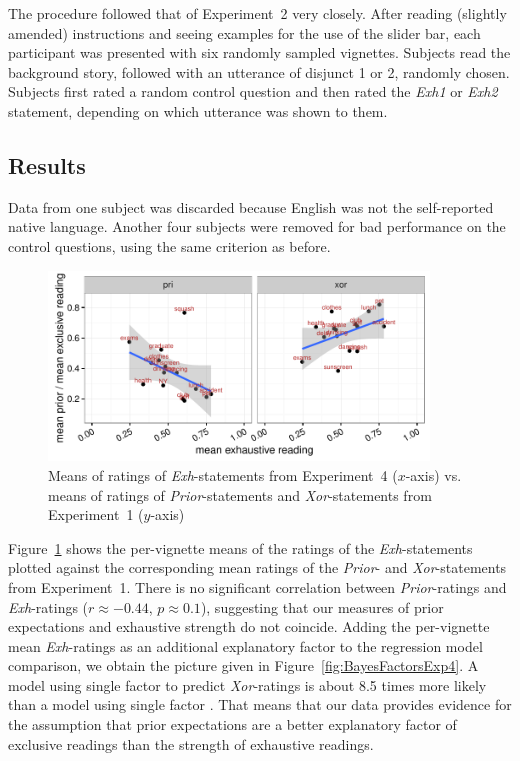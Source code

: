 \documentclass[12pt]{article}
\begin{document}
The procedure followed that of Experiment~2 very closely. After reading (slightly amended)
instructions and seeing examples for the use of the slider bar, each participant was presented
with six randomly sampled vignettes. Subjects read the background story, followed with an
utterance of disjunct 1 or 2, randomly chosen. Subjects first rated a random control question
and then rated the \emph{Exh1} or \emph{Exh2} statement, depending on which utterance was shown
to them.

\subsection{Results}

Data from one subject was discarded because English was not the self-reported native
language. Another four subjects were removed for bad performance on the control questions,
using the same criterion as before.

\begin{figure}
  \centering
  \includegraphics[width=0.9\textwidth]{pics/correlationExhXorPri.pdf}
  \caption{Means of ratings of \emph{Exh}-statements from Experiment~4 ($x$-axis) vs. means of
    ratings of \emph{Prior}-statements and \emph{Xor}-statements from
    Experiment~1 ($y$-axis)}
\label{fig:CorrelationExp1Exp4}
\end{figure}

Figure~\ref{fig:CorrelationExp1Exp4} shows the per-vignette means of the ratings of the
\emph{Exh}-statements plotted against the corresponding mean ratings of the \emph{Prior}- and
\emph{Xor}-statements from Experiment~1. There is no significant correlation between
\emph{Prior}-ratings and \emph{Exh}-ratings ($r \approx -0.44$, $p \approx 0.1$), suggesting
that our measures of prior expectations and exhaustive strength do not coincide. Adding the
per-vignette mean \emph{Exh}-ratings as an additional explanatory factor \exh to the regression
model comparison, we obtain the picture given in Figure~\ref{fig:BayesFactorsExp4}. A model
using single factor \pri to predict \emph{Xor}-ratings is about 8.5 times more likely than a
model using single factor \exh. That means that our data provides evidence for the assumption
that prior expectations are a better explanatory factor of exclusive readings than the strength
of exhaustive readings.
\end{document}
